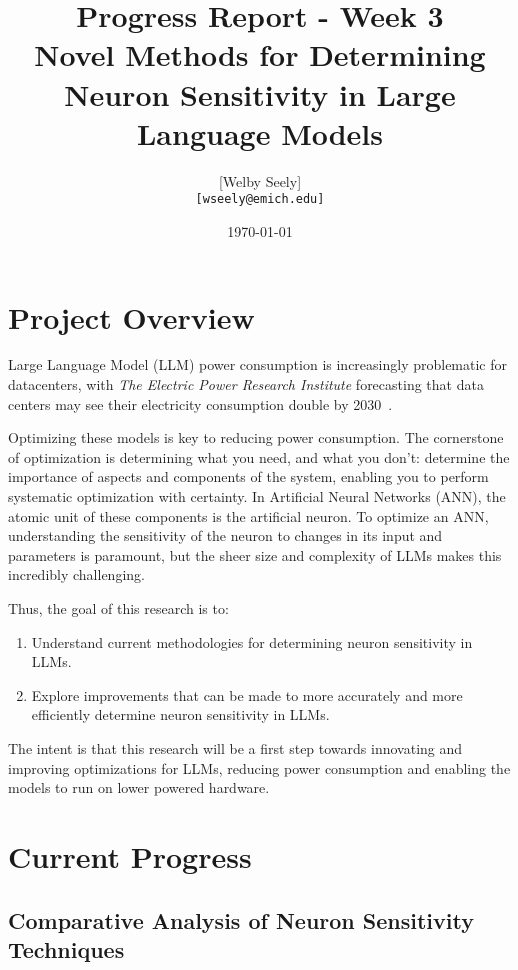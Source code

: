 \documentclass{article}
\title{Progress Report - Week 3 \\
\large Novel Methods for Determining Neuron Sensitivity in Large Language Models}
\author{
    [Welby Seely] \\
    \texttt{[wseely@emich.edu]}
}
\date{\today}
\begin{document}
    \maketitle

    \section{Project Overview}\label{sec:project-overview}
    Large Language Model (LLM) power consumption is increasingly problematic for datacenters, with \textit{The Electric Power
    Research Institute} forecasting that data centers may see their electricity consumption double by
    2030~\cite{kindig2024}.

    Optimizing these models is key to reducing power consumption.
    The cornerstone of optimization is determining what you need, and what you don't: determine the importance of
    aspects and components of the system, enabling you to perform systematic optimization with certainty.
    In Artificial Neural Networks (ANN), the atomic unit of these components is the artificial neuron.
    To optimize an ANN, understanding the sensitivity of the neuron to changes in its input and parameters is paramount,
    but the sheer size and complexity of LLMs makes this incredibly challenging.

    Thus, the goal of this research is to:
    \begin{enumerate}
        \item Understand current methodologies for determining neuron sensitivity in LLMs.
        \item Explore improvements that can be made to more accurately and more efficiently determine neuron sensitivity in
        LLMs.
    \end{enumerate}

    The intent is that this research will be a first step towards innovating and improving optimizations for LLMs,
    reducing power consumption and enabling the models to run on lower powered hardware.

    \section{Current Progress}\label{sec:current-progress}
    \subsection{Comparative Analysis of Neuron Sensitivity Techniques}\label{subsec:comparative-analysis-of-neuron-sensitivity-techniques}
    
    
\end{document}
